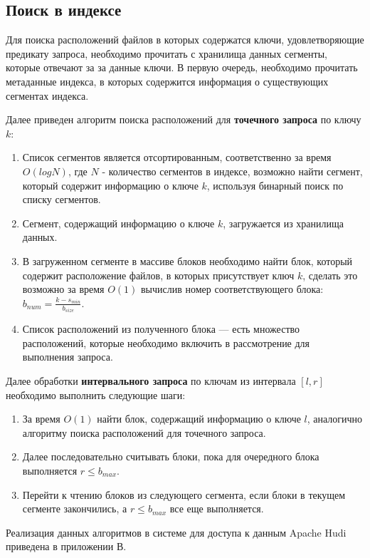 \subsection{Поиск в индексе}\label{search}

Для поиска расположений файлов  в которых содержатся ключи, удовлетворяющие предикату запроса, необходимо прочитать с хранилища данных сегменты, которые отвечают за за данные ключи. В первую очередь, необходимо прочитать метаданные индекса, в которых содержится информация о существующих сегментах индекса.

Далее приведен алгоритм поиска расположений для \textbf{точечного запроса} по ключу $k$:

\begin{enumerate}
    \item Список сегментов является отсортированным, соответственно за время $O(logN)$, где $N$ - количество сегментов в индексе, возможно найти сегмент, который содержит информацию о ключе $k$, используя бинарный поиск по списку сегментов.
    \item Сегмент, содержащий информацию о ключе $k$, загружается из хранилища данных.
    \item В загруженном сегменте в массиве блоков необходимо найти блок, который содержит расположение файлов, в которых присутствует ключ $k$, сделать это возможно за время $O(1)$ вычислив номер соответствующего блока: $b_{num} = \frac{k - s_{min}}{b_{size}}$.
    \item Список расположений из полученного блока --- есть множество расположений, которые необходимо включить в рассмотрение для выполнения запроса.
\end{enumerate}

Далее обработки \textbf{интервального запроса} по ключам из интервала $[l, r]$ необходимо выполнить следующие шаги:

\begin{enumerate}
    \item За время $O(1)$ найти блок, содержащий информацию о ключе $l$, аналогично алгоритму поиска расположений для точечного запроса.
    \item Далее последовательно считывать блоки, пока для очередного блока выполняется $r \leq b_{max}$.
    \item Перейти к чтению блоков из следующего сегмента, если блоки в текущем сегменте закончились, а $r \leq b_{max}$ все еще выполняется. 
\end{enumerate}

Реализация данных алгоритмов в системе для доступа к данным Apache Hudi приведена в приложении В.

